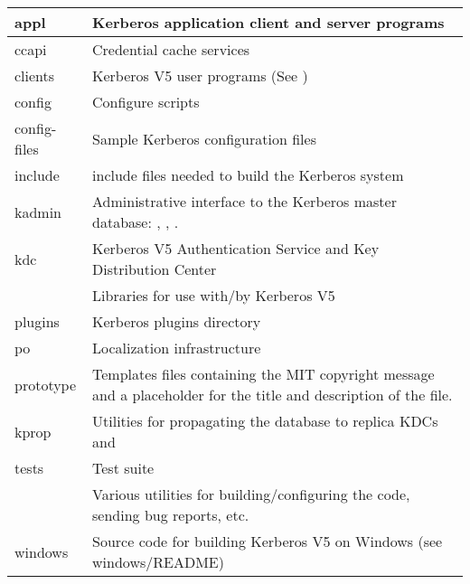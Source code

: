\documentclass[letterpaper,10pt,english]{sphinxmanual}
\begin{document}
\begin{savenotes}\sphinxattablestart
\centering
\begin{tabulary}{\linewidth}[t]{|T|T|}
\hline

appl
&
Kerberos application client and server programs
\\
\hline
ccapi
&
Credential cache services
\\
\hline
clients
&
Kerberos V5 user programs (See )
\\
\hline
config
&
Configure scripts
\\
\hline
config-files
&
Sample Kerberos configuration files
\\
\hline
include
&
include files needed to build the Kerberos system
\\
\hline
kadmin
&
Administrative interface to the Kerberos master database: , , .
\\
\hline
kdc
&
Kerberos V5 Authentication Service and Key Distribution Center
\\
\hline
{\hyperref[\detokenize{build/directory_org:lib}]{}}
&
Libraries for use with/by Kerberos V5
\\
\hline
plugins
&
Kerberos plugins directory
\\
\hline
po
&
Localization infrastructure
\\
\hline
prototype
&
Templates files containing the MIT copyright message and a placeholder for the title and description of the file.
\\
\hline
kprop
&
Utilities for propagating the database to replica KDCs  and 
\\
\hline
tests
&
Test suite
\\
\hline
{\hyperref[\detokenize{build/directory_org:util}]{}}
&
Various utilities for building/configuring the code, sending bug reports, etc.
\\
\hline
windows
&
Source code for building Kerberos V5 on Windows (see windows/README)
\\
\hline
\end{tabulary}
\par
\sphinxattableend\end{savenotes}
\end{document}
